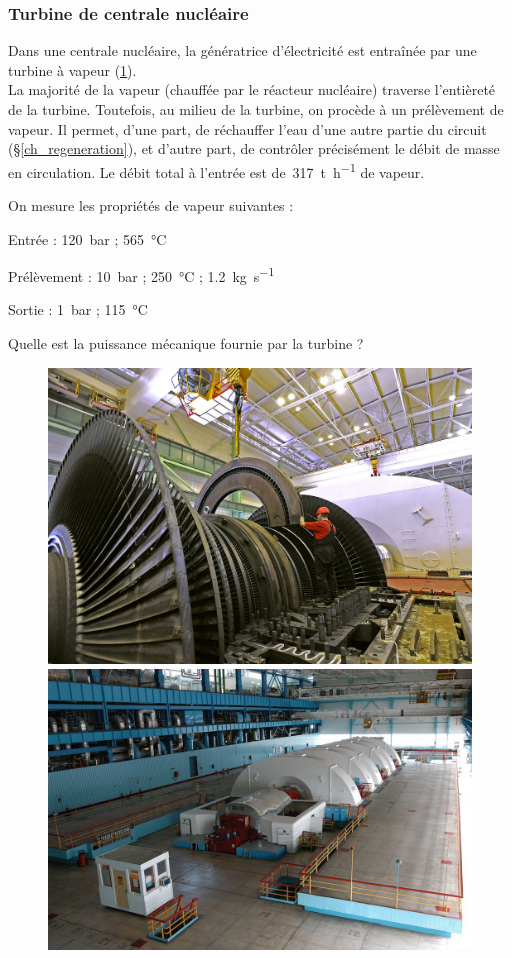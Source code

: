 \subsubsection{Turbine de centrale nucléaire}
\label{exo_turbine_balakovo}

	Dans une centrale nucléaire, la génératrice d’électricité est entraînée par une turbine à vapeur (\cref{fig_centrale_balakovo}).\\
	La majorité de la vapeur (chauffée par le réacteur nucléaire) traverse l’entièreté de la turbine. Toutefois, au milieu de la turbine, on procède à un prélèvement de vapeur. Il permet, d’une part, de réchauffer l’eau d’une autre partie du circuit (\S\ref{ch_regeneration}), et d’autre part, de contrôler précisément le débit de masse en circulation. Le débit total à l’entrée est de~\SI{317}{\tonne\per\hour} de vapeur.
	
	On mesure les propriétés de vapeur suivantes :
	
	\begin{description}
		\item Entrée : 		\tab\SI{120}{\bar} ; 	\SI{565}{\degreeCelsius}
		\item Prélèvement : 	\tab\SI{10}{\bar} ; 	\SI{250}{\degreeCelsius} ;	\SI{1,2}{\kilogram\per\second}
		\item Sortie : 		\tab\SI{1}{\bar} ;		\SI{115}{\degreeCelsius}
	\end{description}

	Quelle est la puissance mécanique fournie par la turbine ?

	\begin{figure}
		\begin{center}
			\includegraphics[height=0.33\textwidth]{images/exercice_turbine_centrale2.jpg}
			\includegraphics[height=0.33\textwidth]{images/exercice_turbine_centrale1.jpg}
		\end{center}
		\label{fig_centrale_balakovo}
	\end{figure}

